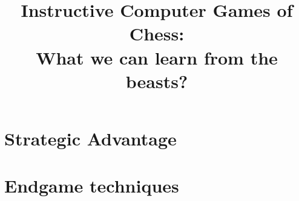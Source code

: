 \documentclass[a4paper,11pt,twocolumn]{report}
\title{Instructive Computer Games of Chess:\\What we can learn from the beasts?}
\begin{document}
\maketitle

\chapter{Strategic Advantage}



\chapter{Endgame techniques}


\end{document}
